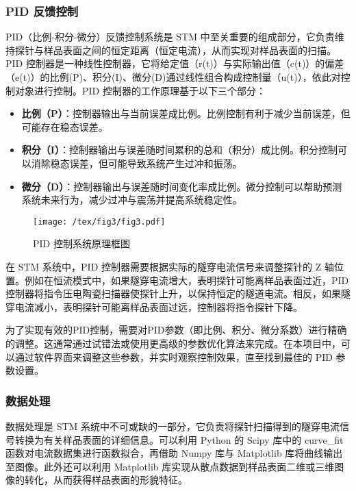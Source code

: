 \documentclass{article}
\begin{document}
\subsubsection{PID 反馈控制}
PID（比例-积分-微分）反馈控制系统是 STM 中至关重要的组成部分，它负责维持探针与样品表面之间的恒定距离（恒定电流），从而实现对样品表面的扫描。PID
控制器是一种线性控制器，它将给定值（r(t)）与实际输出值（c(t)）的偏差（e(t)）的比例(P)、积分(I)、微分(D)通过线性组合构成控制量（u(t)），依此对控制对象进行控制\cite{ref20}。PID
控制器的工作原理基于以下三个部分：
\begin{itemize}
	\item \textbf{比例（P）}：控制器输出与当前误差成比例。比例控制有利于减少当前误差，但可能存在稳态误差。

	\item \textbf{积分（I）}：控制器输出与误差随时间累积的总和（积分）成比例。积分控制可以消除稳态误差，但可能导致系统产生过冲和振荡。

	\item \textbf{微分（D）}：控制器输出与误差随时间变化率成比例。微分控制可以帮助预测系统未来行为，减少过冲与震荡并提高系统稳定性。
\end{itemize}

\begin{figure}[!h]
	\centering
	\texttt{[image: /tex/fig3/fig3.pdf]}
	\caption{PID 控制系统原理框图}
\end{figure}

在 STM 系统中，PID 控制器需要根据实际的隧穿电流信号来调整探针的 Z 轴位置。例如在恒流模式中，如果隧穿电流增大，表明探针可能离样品表面过近，PID 控制器将指令压电陶瓷扫描器使探针上升，以保持恒定的隧道电流。相反，如果隧穿电流减小，表明探针可能离样品表面过远，控制器将指令探针下降。

为了实现有效的PID控制，需要对PID参数（即比例、积分、微分系数）进行精确的调整。这通常通过试错法或使用更高级的参数优化算法来完成。在本项目中，可以通过软件界面来调整这些参数，并实时观察控制效果，直至找到最佳的 PID 参数设置。

\subsubsection{数据处理}
数据处理是 STM 系统中不可或缺的一部分，它负责将探针扫描得到的隧穿电流信号转换为有关样品表面的详细信息。可以利用 Python 的 Scipy 库中的 curve\_fit 函数对电流数据集进行函数拟合，再借助 Numpy 库与 Matplotlib 库将曲线输出至图像。此外还可以利用 Matplotlib 库实现从散点数据到样品表面二维或三维图像的转化，从而获得样品表面的形貌特征。
\end{document}
